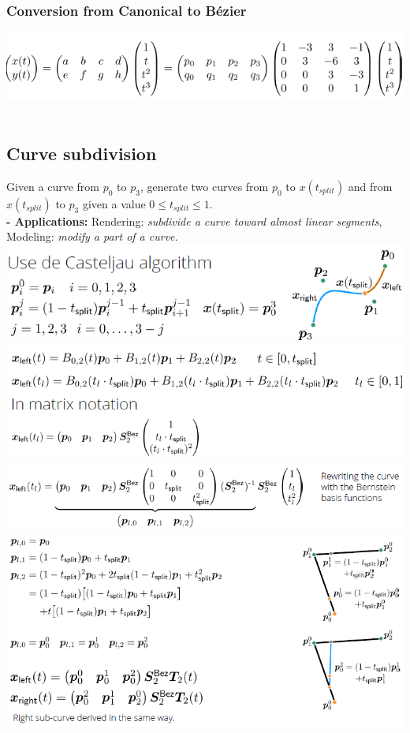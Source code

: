 \documentclass{article}
\begin{document}
\subsubsection{Conversion from Canonical to Bézier}
\includegraphics[scale=0.6]{image72.png}\\\\
\subsection{Curve subdivision}
Given a curve from $p_0$ to $p_3$, generate two curves from $p_0$ to $x(t_{split})$ and from $x(t_{split})$ to $p_3$ given a value $0 \le t_{split} \le 1$.\\
\textbf{- Applications: } Rendering: \textit{subdivide a curve toward almost linear segments}, Modeling: \textit{modify a part of a curve.}\\
\includegraphics[scale=0.5]{image73.png}\\
\includegraphics[scale=0.5]{image74.png}\\
\includegraphics[scale=0.5]{image75.png}\\
\includegraphics[scale=0.5]{image76.png}\\\\
\end{document}
